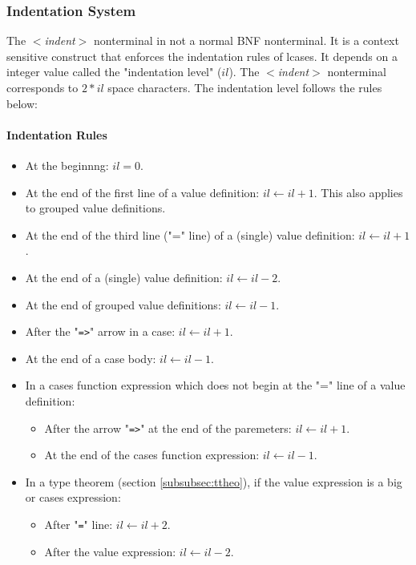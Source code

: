 \documentclass{article}
\begin{document}
\subsubsection{Indentation System}
\label{subsubsec:indsys}

The \textit{$<$indent$>$} nonterminal in not a normal BNF nonterminal. It is a
context sensitive construct that enforces the indentation rules of lcases.
It depends on a integer value called the "indentation level" ($il$).
The \textit{$<$indent$>$} nonterminal corresponds to $2*il$ space characters.
The indentation level follows the rules below:

\paragraph{Indentation Rules}
\begin{itemize}

\item
At the beginnng: $il = 0$.

\item
At the end of the first line of a value definition: $il \leftarrow il + 1$.
This also applies to grouped value definitions.

\item
At the end of the third line ("=" line) of a (single) value definition: $il
\leftarrow il + 1$.

\item
At the end of a (single) value definition: $il \leftarrow il - 2$.

\item
At the end of grouped value definitions: $il \leftarrow il - 1$.

\item
After the "\texttt{=>}" arrow in a case: $il \leftarrow il + 1$.

\item
At the end of a case body: $il \leftarrow il - 1$.

\item
In a cases function expression which does not begin at the "=" line of a value
definition:
  \begin{itemize}

  \item
  After the arrow "\texttt{=>}" at the end of the paremeters: $il \leftarrow il + 1$.

  \item
  At the end of the cases function expression: $il \leftarrow il - 1$.

  \end{itemize}

\item
In a type theorem (section \ref{subsubsec:ttheo}),
if the value expression is a big or cases expression: 
  \begin{itemize}

  \item
  After "\texttt{=}" line: $il \leftarrow il + 2$.

  \item
  After the value expression: $il \leftarrow il - 2$.
  \end{itemize}

\end{itemize}
\end{document}
